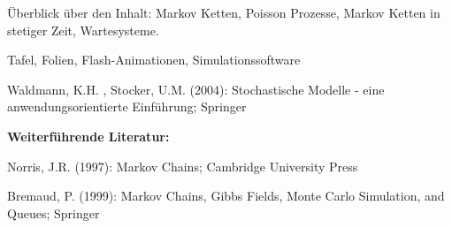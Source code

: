 \begin{course}
\begin{content}
 

Überblick über den Inhalt: Markov Ketten, Poisson Prozesse, Markov Ketten in stetiger Zeit, Wartesysteme.


\end{content}

\begin{media}Tafel, Folien, Flash-Animationen, Simulationssoftware

\end{media}

\begin{literature}Waldmann, K.H. , Stocker, U.M. (2004): Stochastische Modelle - eine anwendungsorientierte Einführung; Springer

 

\textbf{Weiterführende Literatur:}

 

Norris, J.R. (1997): Markov Chains; Cambridge University Press

 

Bremaud, P. (1999): Markov Chains, Gibbs Fields, Monte Carlo Simulation, and Queues; Springer

\end{literature}



\end{course}